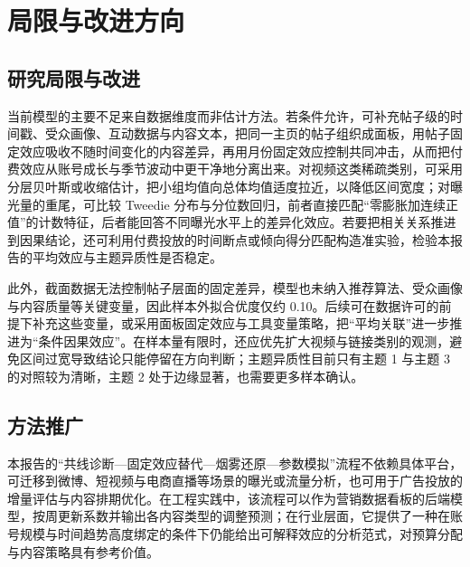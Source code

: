 \section{局限与改进方向}

\subsection{研究局限与改进}

当前模型的主要不足来自数据维度而非估计方法。若条件允许，可补充帖子级的时间戳、受众画像、互动数据与内容文本，把同一主页的帖子组织成面板，用帖子固定效应吸收不随时间变化的内容差异，再用月份固定效应控制共同冲击，从而把付费效应从账号成长与季节波动中更干净地分离出来。对视频这类稀疏类别，可采用分层贝叶斯或收缩估计，把小组均值向总体均值适度拉近，以降低区间宽度；对曝光量的重尾，可比较 Tweedie 分布与分位数回归，前者直接匹配“零膨胀加连续正值”的计数特征，后者能回答不同曝光水平上的差异化效应。若要把相关关系推进到因果结论，还可利用付费投放的时间断点或倾向得分匹配构造准实验，检验本报告的平均效应与主题异质性是否稳定。

此外，截面数据无法控制帖子层面的固定差异，模型也未纳入推荐算法、受众画像与内容质量等关键变量，因此样本外拟合优度仅约 0.10。后续可在数据许可的前提下补充这些变量，或采用面板固定效应与工具变量策略，把“平均关联”进一步推进为“条件因果效应”。在样本量有限时，还应优先扩大视频与链接类别的观测，避免区间过宽导致结论只能停留在方向判断；主题异质性目前只有主题 1 与主题 3 的对照较为清晰，主题 2 处于边缘显著，也需要更多样本确认。

\subsection{方法推广}

本报告的“共线诊断—固定效应替代—烟雾还原—参数模拟”流程不依赖具体平台，可迁移到微博、短视频与电商直播等场景的曝光或流量分析，也可用于广告投放的增量评估与内容排期优化。在工程实践中，该流程可以作为营销数据看板的后端模型，按周更新系数并输出各内容类型的调整预测；在行业层面，它提供了一种在账号规模与时间趋势高度绑定的条件下仍能给出可解释效应的分析范式，对预算分配与内容策略具有参考价值。
